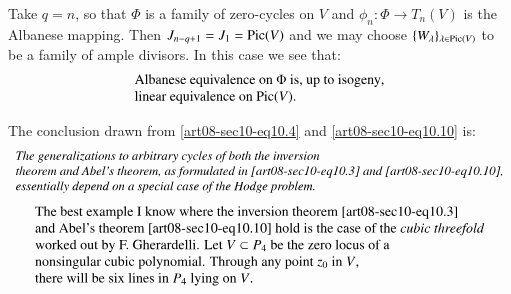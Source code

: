 \begin{subexample}\label{art08-sec10-exam10.15}
Take $q=n$, so that $\Phi$ is a family of zero-cycles on $V$ and $\phi_{n}:\Phi\to T_{n}(V)$ is the Albanese mapping. Then $J_{n-q+1}=J_{1}=\operatorname{\mathrm{Pic}}(V)$ and we may choose $\{W_{\lambda}\}_{\lambda\in \operatorname{\mathrm{Pic}}(V)}$ to be a family of ample divisors. In this case we see that:
\begin{equation}
\begin{array}{l}
\text{Albanese equivalence on $\Phi$ is, up to isogeny},\\
\text{linear equivalence on $\operatorname{\mathrm{Pic}}(V)$.}
\end{array}\label{art08-sec10-eq10.16}
\end{equation}

The conclusion drawn from \eqref{art08-sec10-eq10.4} and \eqref{art08-sec10-eq10.10} is:
\begin{equation}
\begin{array}{l}
\text{\em The generalizations to arbitrary cycles of both the inversion}\\
\text{\em theorem and Abel's theorem, as formulated in \eqref{art08-sec10-eq10.3} and \eqref{art08-sec10-eq10.10},}\\
\text{\em essentially depend on a special case of the Hodge problem.}
\end{array}\label{art08-sec10-eq10.17}
\end{equation}
\begin{equation}
\begin{array}{l}
\text{The best example I know where the inversion theorem \eqref{art08-sec10-eq10.3}}\\
\text{and Abel's theorem \eqref{art08-sec10-eq10.10} hold is the case of the {\em cubic threefold}}\\
\text{worked out by F. Gherardelli. Let $V\subset P_{4}$ be the zero locus of a}\\
\text{nonsingular cubic polynomial. Through any point $z_{0}$ in $V$,}\\
\text{there will be six lines in $P_{4}$ lying on $V$.}
\end{array}\label{art08-sec10-eq10.18}
\end{equation}\pageoriginale
\end{subexample}

